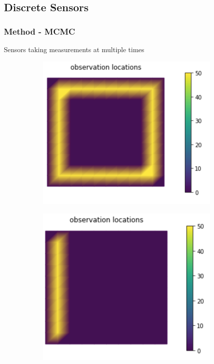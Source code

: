 \documentclass[9pt]{beamer}
\begin{document}
\subsection{Discrete Sensors}
\begin{frame}
\frametitle{Method - MCMC}
Sensors taking measurements at multiple times

\begin{figure}
\hspace{-2cm}
\begin{subfigure}{0.3\textwidth}
	\includegraphics[scale= 0.45]{obs_loc.png}
\end{subfigure}
\hspace{2.5cm}
\begin{subfigure}{0.25\textwidth}
	\includegraphics[scale= 0.45]{obs_loc_1side.png}
\end{subfigure}
\end{figure}


\end{frame}
\end{document}
